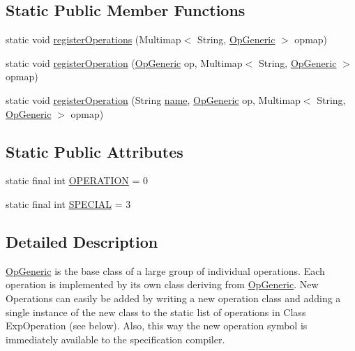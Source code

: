 \subsection*{Static Public Member Functions}
\begin{DoxyCompactItemize}
\item 
static void \hyperlink{classorg_1_1tzi_1_1use_1_1uml_1_1ocl_1_1expr_1_1operations_1_1_op_generic_a2f61875e8516f003f126466efa545a67}{register\-Operations} (Multimap$<$ String, \hyperlink{classorg_1_1tzi_1_1use_1_1uml_1_1ocl_1_1expr_1_1operations_1_1_op_generic}{Op\-Generic} $>$ opmap)
\item 
static void \hyperlink{classorg_1_1tzi_1_1use_1_1uml_1_1ocl_1_1expr_1_1operations_1_1_op_generic_a5f9d657fe9f7c8e8268e067dd95c4af9}{register\-Operation} (\hyperlink{classorg_1_1tzi_1_1use_1_1uml_1_1ocl_1_1expr_1_1operations_1_1_op_generic}{Op\-Generic} op, Multimap$<$ String, \hyperlink{classorg_1_1tzi_1_1use_1_1uml_1_1ocl_1_1expr_1_1operations_1_1_op_generic}{Op\-Generic} $>$ opmap)
\item 
static void \hyperlink{classorg_1_1tzi_1_1use_1_1uml_1_1ocl_1_1expr_1_1operations_1_1_op_generic_ada73c6888d370f9c93f5899fbcaaa2a9}{register\-Operation} (String \hyperlink{classorg_1_1tzi_1_1use_1_1uml_1_1ocl_1_1expr_1_1operations_1_1_op_generic_a3e9ec221ff4b50fd7db10f79ec844107}{name}, \hyperlink{classorg_1_1tzi_1_1use_1_1uml_1_1ocl_1_1expr_1_1operations_1_1_op_generic}{Op\-Generic} op, Multimap$<$ String, \hyperlink{classorg_1_1tzi_1_1use_1_1uml_1_1ocl_1_1expr_1_1operations_1_1_op_generic}{Op\-Generic} $>$ opmap)
\end{DoxyCompactItemize}
\subsection*{Static Public Attributes}
\begin{DoxyCompactItemize}
\item 
static final int \hyperlink{classorg_1_1tzi_1_1use_1_1uml_1_1ocl_1_1expr_1_1operations_1_1_op_generic_a6a5f036b56e41acf7fe556d9e1c988be}{O\-P\-E\-R\-A\-T\-I\-O\-N} = 0
\item 
static final int \hyperlink{classorg_1_1tzi_1_1use_1_1uml_1_1ocl_1_1expr_1_1operations_1_1_op_generic_a7a2ddd700331b8b06dc5482b7d288716}{S\-P\-E\-C\-I\-A\-L} = 3
\end{DoxyCompactItemize}


\subsection{Detailed Description}
\hyperlink{classorg_1_1tzi_1_1use_1_1uml_1_1ocl_1_1expr_1_1operations_1_1_op_generic}{Op\-Generic} is the base class of a large group of individual operations. Each operation is implemented by its own class deriving from \hyperlink{classorg_1_1tzi_1_1use_1_1uml_1_1ocl_1_1expr_1_1operations_1_1_op_generic}{Op\-Generic}. New Operations can easily be added by writing a new operation class and adding a single instance of the new class to the static list of operations in Class Exp\-Operation (see below). Also, this way the new operation symbol is immediately available to the specification compiler.

